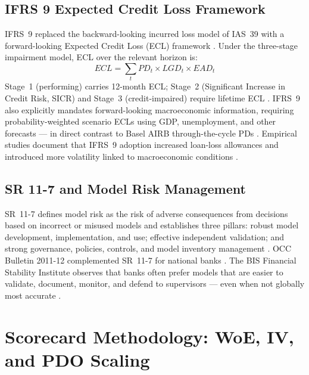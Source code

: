 \documentclass[12pt,a4paper]{report}
\begin{document}
\subsection{IFRS 9 Expected Credit Loss Framework}

IFRS~9 replaced the backward-looking incurred loss model of IAS~39 with a forward-looking Expected Credit Loss (ECL) framework \cite{iasb2014, fsi_bis2015}. Under the three-stage impairment model, ECL over the relevant horizon is:
\begin{equation}
  ECL = \sum_{t} PD_t \times LGD_t \times EAD_t
\end{equation}
Stage~1 (performing) carries 12-month ECL; Stage~2 (Significant Increase in Credit Risk, SICR) and Stage~3 (credit-impaired) require lifetime ECL \cite{bundesbank2019}. IFRS~9 also explicitly mandates forward-looking macroeconomic information, requiring probability-weighted scenario ECLs using GDP, unemployment, and other forecasts --- in direct contrast to Basel AIRB through-the-cycle PDs \cite{bdo2024}. Empirical studies document that IFRS~9 adoption increased loan-loss allowances and introduced more volatility linked to macroeconomic conditions \cite{pmc2024}.

\subsection{SR 11-7 and Model Risk Management}

SR~11-7 defines model risk as the risk of adverse consequences from decisions based on incorrect or misused models and establishes three pillars: robust model development, implementation, and use; effective independent validation; and strong governance, policies, controls, and model inventory management \cite{sr117}. OCC Bulletin 2011-12 complemented SR~11-7 for national banks \cite{occ2011}. The BIS Financial Stability Institute observes that banks often prefer models that are easier to validate, document, monitor, and defend to supervisors --- even when not globally most accurate \cite{bis_fsi2024}.

\section{Scorecard Methodology: WoE, IV, and PDO Scaling}
\label{sec:scorecard}
\end{document}
